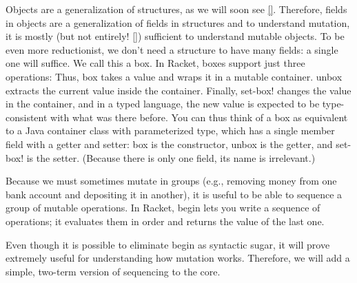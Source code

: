\secdown
{}

Objects are a generalization of structures, as we will soon see \ref{}.
Therefore, fields in objects are a generalization of fields in structures and to
understand mutation, it is mostly (but not entirely! \ref{}) sufficient to
understand mutable objects. To be even more reductionist, we don’t need a
structure to have many fields: a single one will suffice. We call this a box. In
Racket, boxes support just three operations:
Thus, box takes a value and wraps it in a mutable container. unbox extracts the
current value inside the container. Finally, set-box! changes the value in the
container, and in a typed language, the new value is expected to be
type-consistent with what was there before. You can thus think of a box as
equivalent to a Java container class with parameterized type, which has a single
member field with a getter and setter: box is the constructor, unbox is the
getter, and set-box! is the setter. (Because there is only one field, its name
is irrelevant.)

Because we must sometimes mutate in groups (e.g., removing money from one bank
account and depositing it in another), it is useful to be able to sequence a
group of mutable operations. In Racket, begin lets you write a sequence of
operations; it evaluates them in order and returns the value of the last one.


Even though it is possible to eliminate begin as syntactic sugar, it will prove
extremely useful for understanding how mutation works. Therefore, we will add a
simple, two-term version of sequencing to the core.


